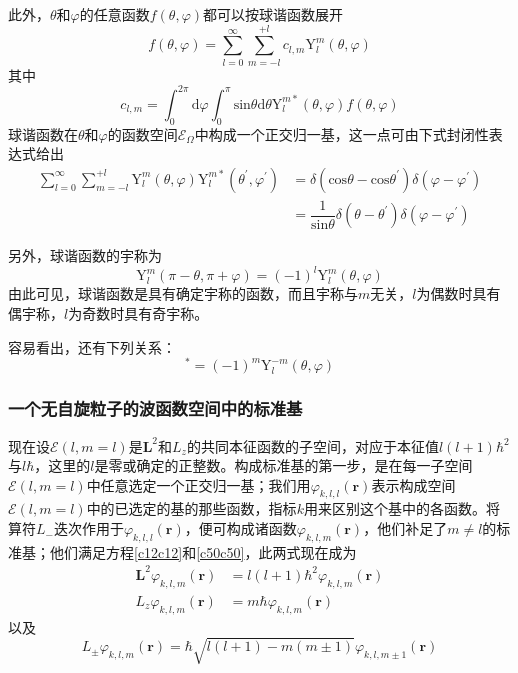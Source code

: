 \documentclass[]{article}
\begin{document}
此外，$\theta$和$\varphi$的任意函数$f(\theta,\varphi)$都可以按球谐函数展开
\begin{equation}
	f(\theta,\varphi)=\sum\limits_{l=0}^{\infty}\sum\limits_{m=-l}^{+l}c_{l,m}\mathrm{Y}_l^m(\theta,\varphi)
\end{equation}
其中
\begin{equation}
	c_{l,m}=\int_{0}^{2\pi}\mathrm{d}\varphi\int_{0}^{\pi}\mathrm{sin}\theta\mathrm{d}\theta \mathrm{Y}_l^{m*}(\theta,\varphi)f(\theta,\varphi)
\end{equation}
球谐函数在$\theta$和$\varphi$的函数空间$\mathscr{E}_\Omega$中构成一个正交归一基，这一点可由下式封闭性表达式给出
\begin{align}
	\sum\limits_{l=0}^{\infty}\sum\limits_{m=-l}^{+l}\mathrm{Y}_l^m(\theta,\varphi)\mathrm{Y}_l^{m*}(\theta^\prime,\varphi^\prime)&=\delta(\mathrm{cos}\theta-\mathrm{cos}\theta^\prime)\delta(\varphi-\varphi^\prime)\nonumber\\
	&=\dfrac{1}{\mathrm{sin}\theta}\delta(\theta-\theta^\prime)\delta(\varphi-\varphi^\prime)
\end{align}

另外，球谐函数的宇称为
\begin{equation}
	\mathrm{Y}_l^m(\pi-\theta,\pi+\varphi)=(-1)^l\mathrm{Y}_l^m(\theta,\varphi)
\end{equation}
由此可见，球谐函数是具有确定宇称的函数，而且宇称与$m$无关，$l$为偶数时具有偶宇称，$l$为奇数时具有奇宇称。\par 
容易看出，还有下列关系：
\begin{equation}
	[\mathrm{Y}_l^m(\theta,\varphi)]^*=(-1)^m\mathrm{Y}_l^{-m}(\theta,\varphi)
\end{equation}
\subsubsection{一个无自旋粒子的波函数空间中的标准基}
现在设$\mathscr{E}(l,m=l)$是$\boldsymbol{L}^2$和$L_z$的共同本征函数的子空间，对应于本征值$l(l+1)\hbar^2$与$l\hbar$，这里的$l$是零或确定的正整数。构成标准基的第一步，是在每一子空间$\mathscr{E}(l,m=l)$中任意选定一个正交归一基；我们用$\varphi_{k,l,l}(\boldsymbol{r})$表示构成空间$\mathscr{E}(l,m=l)$中的已选定的基的那些函数，指标$k$用来区别这个基中的各函数。将算符$L_-$迭次作用于$\varphi_{k,l,l}(\boldsymbol{r})$，便可构成诸函数$\varphi_{k,l,m}(\boldsymbol{r})$，他们补足了$m\neq l$的标准基；他们满足方程\eqref{c12c12}和\eqref{c50c50}，此两式现在成为
\begin{align}
	\boldsymbol{L}^2\varphi_{k,l,m}(\boldsymbol{r})&=l(l+1)\hbar^2\varphi_{k,l,m}(\boldsymbol{r})\nonumber\\
	L_z\varphi_{k,l,m}(\boldsymbol{r})&=m\hbar\varphi_{k,l,m}(\boldsymbol{r}) 
	\label{d30d30}
\end{align}
以及
\begin{equation}
	L_\pm\varphi_{k,l,m}(\boldsymbol{r})=\hbar\sqrt{l(l+1)-m(m\pm1)}\varphi_{k,l,m\pm1}(\boldsymbol{r})
	\label{d31d31}
\end{equation}
\end{document}
